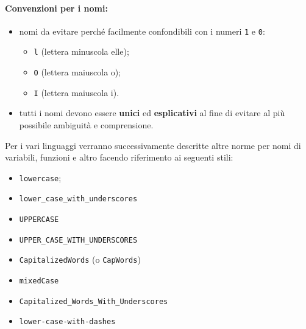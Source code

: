 \documentclass[NormeDiProgetto.tex]{subfiles}
\begin{document}
\paragraph*{Convenzioni per i nomi: }
\begin{itemize}
	\item nomi da evitare perché facilmente confondibili con i numeri \texttt{1} e \texttt{0}:
	\begin{itemize}
		\item \texttt{l} (lettera minuscola elle);
		\item \texttt{O} (lettera maiuscola o);
		\item \texttt{I} (lettera maiuscola i).
	\end{itemize}
	\item tutti i nomi devono essere \textbf{unici} ed \textbf{esplicativi} al fine di evitare al più possibile ambiguità e comprensione.
\end{itemize}
Per i vari linguaggi verranno successivamente descritte altre norme per nomi di variabili, funzioni e altro facendo riferimento ai seguenti stili:
\begin{itemize}
	\item \texttt{lowercase};
	\item \texttt{lower\_case\_with\_underscores}
	\item \texttt{UPPERCASE}
	\item \texttt{UPPER\_CASE\_WITH\_UNDERSCORES}
	\item \texttt{CapitalizedWords} (o \texttt{CapWords})
	\item \texttt{mixedCase}
	\item \texttt{Capitalized\_Words\_With\_Underscores}
	\item \texttt{lower-case-with-dashes}	
\end{itemize}
\end{document}

